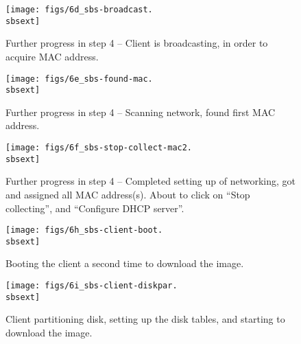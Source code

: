 \begin{figure}[htbp]
  \begin{center}
    \centerline{\texttt{[image: figs/6d\_sbs-broadcast.\\sbsext]}}
    \caption{Further progress in step 4 -- Client is broadcasting, in
      order to acquire MAC address.}
    \label{fig:sbs-collect-broadcast} 
  \end{center}
\end{figure}

\begin{figure}[htbp]
  \begin{center}
    \centerline{\texttt{[image: figs/6e\_sbs-found-mac.\\sbsext]}}
    \caption{Further progress in step 4 -- Scanning network, found
      first MAC address.}
    \label{fig:sbs-setup-network2}
  \end{center}
\end{figure}

\begin{figure}[htbp]
  \begin{center}
    \centerline{\texttt{[image: figs/6f\_sbs-stop-collect-mac2.\\sbsext]}}
   \caption[Further progress in step 4 -- Completed setup of
   networking.]{Further progress in step 4 -- Completed setting up of
     networking, got and assigned all MAC address(s).  About to click
     on ``Stop collecting'', and ``Configure DHCP server''.}
    \label{fig:sbs-setup-network3}
  \end{center}
\end{figure}


\begin{figure}[htbp]
  \begin{center}
    \centerline{\texttt{[image: figs/6h\_sbs-client-boot.\\sbsext]}}
    \caption{Booting the client a second time to download the image.}
    \label{fig:sbs-install-boot}
  \end{center}
\end{figure}

\begin{figure}[htbp]
  \begin{center}
    \centerline{\texttt{[image: figs/6i\_sbs-client-diskpar.\\sbsext]}}
    \caption{Client partitioning disk, setting up the disk tables, and
      starting to download the image.}
    \label{fig:sbs-install-diskpar}
  \end{center}
\end{figure}
  
